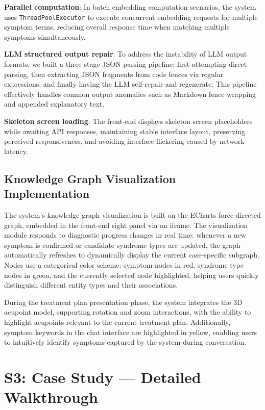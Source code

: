 \documentclass[12pt]{article}
\begin{document}
\textbf{Parallel computation}: In batch embedding computation scenarios, the system uses \texttt{ThreadPoolExecutor} to execute concurrent embedding requests for multiple symptom terms, reducing overall response time when matching multiple symptoms simultaneously.

\textbf{LLM structured output repair}: To address the instability of LLM output formats, we built a three-stage JSON parsing pipeline: first attempting direct parsing, then extracting JSON fragments from code fences via regular expressions, and finally having the LLM self-repair and regenerate. This pipeline effectively handles common output anomalies such as Markdown fence wrapping and appended explanatory text.

\textbf{Skeleton screen loading}: The front-end displays skeleton screen placeholders while awaiting API responses, maintaining stable interface layout, preserving perceived responsiveness, and avoiding interface flickering caused by network latency.

\subsection{Knowledge Graph Visualization Implementation}\label{subsec:kg-viz}

The system's knowledge graph visualization is built on the ECharts force-directed graph, embedded in the front-end right panel via an iframe. The visualization module responds to diagnostic progress changes in real time: whenever a new symptom is confirmed or candidate syndrome types are updated, the graph automatically refreshes to dynamically display the current case-specific subgraph. Nodes use a categorical color scheme: symptom nodes in red, syndrome type nodes in green, and the currently selected node highlighted, helping users quickly distinguish different entity types and their associations.

During the treatment plan presentation phase, the system integrates the 3D acupoint model, supporting rotation and zoom interactions, with the ability to highlight acupoints relevant to the current treatment plan. Additionally, symptom keywords in the chat interface are highlighted in yellow, enabling users to intuitively identify symptoms captured by the system during conversation.

\section{S3: Case Study --- Detailed Walkthrough}
\label{sec:si-case-study}
\end{document}
